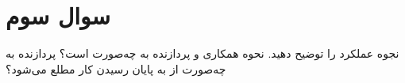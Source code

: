 \section{سوال سوم}

نجوه عملکرد  را توضیح دهید. نحوه همکاری  و پردازنده به چه‌صورت است؟ پردازنده به چه‌صورت از به پایان رسیدن کار  مطلع می‌شود؟


\begin{qsolve}
	
\end{qsolve}
